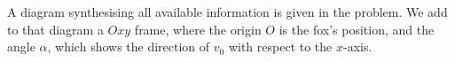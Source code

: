 %
%

\begin{center}
\vspace*{5mm}
\end{center}

A diagram synthesising all available information is given in the problem. We add to that diagram a $Oxy$ frame, where the origin $O$ is the fox's position, and the angle $\alpha$, which shows the direction of $v_0$ with respect to the $x$-axis.
\begin{center}

\end{center}
